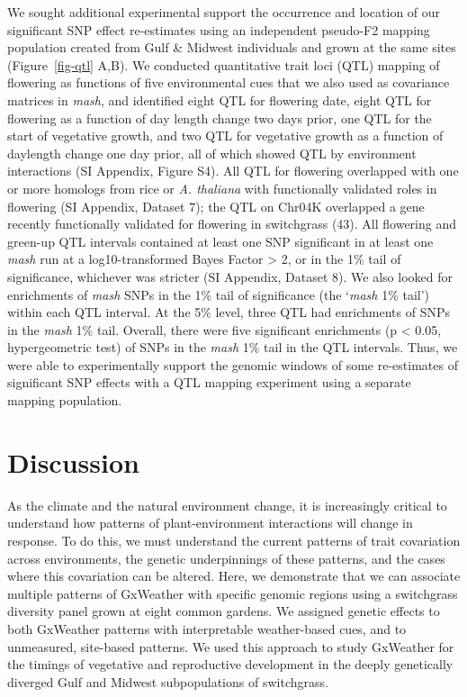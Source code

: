 \documentclass[
  9pt,
  twocolumn,
  twoside]{pnas-new}
\begin{document}
We sought additional experimental support the occurrence and location of
our significant SNP effect re-estimates using an independent pseudo-F2
mapping population created from Gulf \& Midwest individuals and grown at
the same sites (Figure~\ref{fig-qtl} A,B). We conducted quantitative
trait loci (QTL) mapping of flowering as functions of five environmental
cues that we also used as covariance matrices in \emph{mash}, and
identified eight QTL for flowering date, eight QTL for flowering as a
function of day length change two days prior, one QTL for the start of
vegetative growth, and two QTL for vegetative growth as a function of
daylength change one day prior, all of which showed QTL by environment
interactions (SI Appendix, Figure S4). All QTL for flowering overlapped
with one or more homologs from rice or \emph{A. thaliana} with
functionally validated roles in flowering (SI Appendix, Dataset 7); the
QTL on Chr04K overlapped a gene recently functionally validated for
flowering in switchgrass (43). All flowering and green-up QTL intervals
contained at least one SNP significant in at least one \emph{mash} run
at a log10-transformed Bayes Factor \textgreater{} 2, or in the 1\% tail
of significance, whichever was stricter (SI Appendix, Dataset 8). We
also looked for enrichments of \emph{mash} SNPs in the 1\% tail of
significance (the `\emph{mash} 1\% tail') within each QTL interval. At
the 5\% level, three QTL had enrichments of SNPs in the \emph{mash} 1\%
tail. Overall, there were five significant enrichments (p \textless{}
0.05, hypergeometric test) of SNPs in the \emph{mash} 1\% tail in the
QTL intervals. Thus, we were able to experimentally support the genomic
windows of some re-estimates of significant SNP effects with a QTL
mapping experiment using a separate mapping population.

\section{Discussion}\label{discussion}

As the climate and the natural environment change, it is increasingly
critical to understand how patterns of plant-environment interactions
will change in response. To do this, we must understand the current
patterns of trait covariation across environments, the genetic
underpinnings of these patterns, and the cases where this covariation
can be altered. Here, we demonstrate that we can associate multiple
patterns of GxWeather with specific genomic regions using a switchgrass
diversity panel grown at eight common gardens. We assigned genetic
effects to both GxWeather patterns with interpretable weather-based
cues, and to unmeasured, site-based patterns. We used this approach to
study GxWeather for the timings of vegetative and reproductive
development in the deeply genetically diverged Gulf and Midwest
subpopulations of switchgrass.
\end{document}
